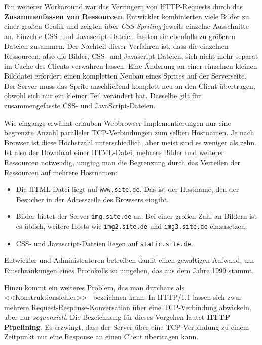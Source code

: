 \documentclass[a4paper, justified, notoc]{tufte-handout} %
\begin{document}
Ein weiterer Workaround war das Verringern von HTTP-Requests durch das \textbf{Zusammenfassen von Ressourcen}. Entwickler kombinierten viele Bilder zu einer großen Grafik und zeigten über \emph{CSS-Spriting} jeweils einzelne Ausschnitte an. Einzelne CSS- und Javascript-Dateien fassten sie ebenfalls zu größeren Dateien zusammen. Der Nachteil dieser Verfahren ist, dass die einzelnen Ressourcen, also die Bilder, CSS- und Javascript-Dateien, sich nicht mehr separat im Cache des Clients verwahren lassen. Eine Änderung an einer einzelnen kleinen Bilddatei erfordert einen kompletten Neubau eines Sprites auf der Serverseite. Der Server muss das Sprite anschließend komplett neu an den Client übertragen, obwohl sich nur ein kleiner Teil verändert hat. Dasselbe gilt für zusammengefasste CSS- und JavaScript-Dateien.

Wie eingangs erwähnt erlauben Webbrowser-Implementierungen nur eine begrenzte Anzahl paralleler TCP-Verbindungen zum selben Hostnamen. Je nach Browser ist diese Höchstzahl unterschiedlich, aber meist sind es weniger als zehn. Ist also der Download einer HTML-Datei, mehrere Bilder und weiterer Ressourcen notwendig, umging man die Begrenzung durch das Verteilen der Ressourcen auf mehrere Hostnamen:

\begin{itemize}
	\item Die HTML-Datei liegt auf \texttt{www.site.de}. Das ist der Hostname, den der Besucher in der Adresszeile des Browsers eingibt.
	\item Bilder bietet der Server \texttt{img.site.de} an. Bei einer großen Zahl an Bildern ist es üblich, weitere Hosts wie \texttt{img2.site.de} und \texttt{img3.site.de} einzusetzen.
	\item CSS- und Javascript-Dateien liegen auf \texttt{static.site.de}.
\end{itemize}
Entwickler und Administratoren betreiben damit einen gewaltigen Aufwand, um Einschränkungen eines Protokolls zu umgehen, das aus dem Jahre 1999 stammt.

Hinzu kommt ein weiteres Problem, das man durchaus als <<Konstruktionsfehler>>~\citep{heise:2018} bezeichnen kann: In HTTP/1.1 lassen sich zwar mehrere Request-Response-Konversation über eine TCP-Verbindung abwickeln, aber nur \emph{sequenziell}. Die Bezeichnung für dieses Vorgehen lautet \textbf{HTTP Pipelining}. Es erzwingt, dass der Server über eine TCP-Verbindung zu einem Zeitpunkt nur eine Response an einen Client übertragen kann.
\end{document}
